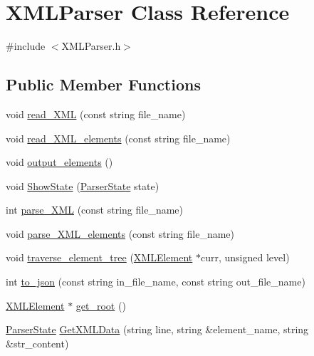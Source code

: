 \hypertarget{class_x_m_l_parser}{}\section{X\+M\+L\+Parser Class Reference}
\label{class_x_m_l_parser}


{\ttfamily \#include $<$X\+M\+L\+Parser.\+h$>$}

\subsection*{Public Member Functions}
\begin{DoxyCompactItemize}
\item 
void \hyperlink{class_x_m_l_parser_adb81d764261b1d0e31c9ecb4da962a54}{read\+\_\+\+X\+M\+L} (const string file\+\_\+name)
\item 
void \hyperlink{class_x_m_l_parser_ac83854507080fb137a8235aebd85fe82}{read\+\_\+\+X\+M\+L\+\_\+elements} (const string file\+\_\+name)
\item 
void \hyperlink{class_x_m_l_parser_a3185e16eab0e9a612cb4b184917224de}{output\+\_\+elements} ()
\item 
void \hyperlink{class_x_m_l_parser_ab894a59fd3499e352a78dd58a316745f}{Show\+State} (\hyperlink{_x_m_l_parser_8h_acf067a9f09c2b2135f1a80d61e5eb253}{Parser\+State} state)
\item 
int \hyperlink{class_x_m_l_parser_a58677ce4e57656578db2b60a96a9b0fa}{parse\+\_\+\+X\+M\+L} (const string file\+\_\+name)
\item 
void \hyperlink{class_x_m_l_parser_a276ee49ab69d353541499c0b012e3524}{parse\+\_\+\+X\+M\+L\+\_\+elements} (const string file\+\_\+name)
\item 
void \hyperlink{class_x_m_l_parser_a64e7d03169d059ba69dddfb984ba2d06}{traverse\+\_\+element\+\_\+tree} (\hyperlink{class_x_m_l_element}{X\+M\+L\+Element} $\ast$curr, unsigned level)
\item 
int \hyperlink{class_x_m_l_parser_ad7d27954988bb2d495f091dbb1d665e7}{to\+\_\+json} (const string in\+\_\+file\+\_\+name, const string out\+\_\+file\+\_\+name)
\item 
\hyperlink{class_x_m_l_element}{X\+M\+L\+Element} $\ast$ \hyperlink{class_x_m_l_parser_affe95b88edc32d97a503d28e6d8bece7}{get\+\_\+root} ()
\item 
\hyperlink{_x_m_l_parser_8h_acf067a9f09c2b2135f1a80d61e5eb253}{Parser\+State} \hyperlink{class_x_m_l_parser_a59ecf455aa52d3bf749d42aa2d01e645}{Get\+X\+M\+L\+Data} (string line, string \&element\+\_\+name, string \&str\+\_\+content)
\end{DoxyCompactItemize}
